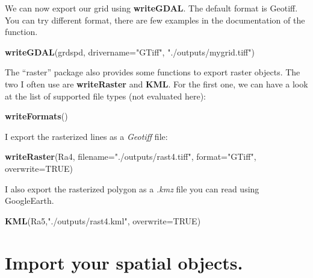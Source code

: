 \documentclass[]{report}
\newenvironment{Shaded}{\begin{snugshade}}{\end{snugshade}}
\newcommand{\DataTypeTok}[1]{\textcolor[rgb]{0.13,0.29,0.53}{#1}}
\newcommand{\KeywordTok}[1]{\textcolor[rgb]{0.13,0.29,0.53}{\textbf{#1}}}
\newcommand{\NormalTok}[1]{#1}
\newcommand{\OtherTok}[1]{\textcolor[rgb]{0.56,0.35,0.01}{#1}}
\newcommand{\StringTok}[1]{\textcolor[rgb]{0.31,0.60,0.02}{#1}}
\begin{document}
We can now export our grid using \textbf{writeGDAL}. The default format
is Geotiff. You can try different format, there are few examples in the
documentation of the function.

\begin{Shaded}
\begin{Highlighting}[]
\KeywordTok{writeGDAL}\NormalTok{(grdspd, }\DataTypeTok{drivername=}\StringTok{"GTiff"}\NormalTok{, }\StringTok{"./outputs/mygrid.tiff"}\NormalTok{)}
\end{Highlighting}
\end{Shaded}

The ``raster'' package also provides some functions to export raster
objects. The two I often use are \textbf{writeRaster} and \textbf{KML}.
For the first one, we can have a look at the list of supported file
types (not evaluated here):

\begin{Shaded}
\begin{Highlighting}[]
\KeywordTok{writeFormats}\NormalTok{()}
\end{Highlighting}
\end{Shaded}

I export the rasterized lines as a \emph{Geotiff} file:

\begin{Shaded}
\begin{Highlighting}[]
\KeywordTok{writeRaster}\NormalTok{(Ra4, }\DataTypeTok{filename=}\StringTok{"./outputs/rast4.tiff"}\NormalTok{, }\DataTypeTok{format=}\StringTok{"GTiff"}\NormalTok{, }\DataTypeTok{overwrite=}\OtherTok{TRUE}\NormalTok{)}
\end{Highlighting}
\end{Shaded}

I also export the rasterized polygon as a \emph{.kmz} file you can read
using GoogleEarth.

\begin{Shaded}
\begin{Highlighting}[]
\KeywordTok{KML}\NormalTok{(Ra5,}\StringTok{"./outputs/rast4.kml"}\NormalTok{, }\DataTypeTok{overwrite=}\OtherTok{TRUE}\NormalTok{)}
\end{Highlighting}
\end{Shaded}

\hypertarget{import-your-spatial-objects.}{%
\section{Import your spatial
objects.}\label{import-your-spatial-objects.}}
\end{document}
